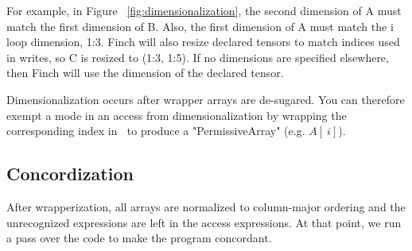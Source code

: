     For example, in Figure ~\ref{fig:dimensionalization}, the second dimension of A must match the first dimension of B. Also, the first dimension of A must match the i loop dimension, 1:3. Finch will also resize declared tensors to match indices used in writes, so C is resized to (1:3, 1:5). If no dimensions are specified elsewhere, then Finch will use the dimension of the declared tensor.
    
    Dimensionalization occurs after wrapper arrays are de-sugared. You can
    therefore exempt a mode in an access from dimensionalization by wrapping the
    corresponding index in $~$ to produce a "PermissiveArray" (e.g. $A[~i]$).
    
\subsection{Concordization}
    After wrapperization, all arrays are normalized to column-major ordering and
    the unrecognized expressions are left in the access expressions. At that
    point, we run a pass over the code to make the program concordant.
    
